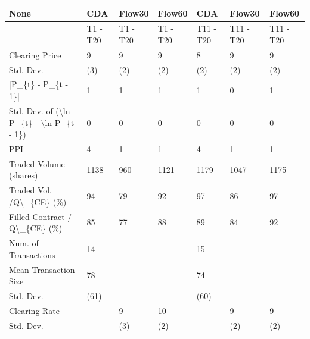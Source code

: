 \begin{tabular}{lllllll}
\hline
 None                                                      & CDA      & Flow30   & Flow60   & CDA       & Flow30    & Flow60    \\
\hline
                                                           & T1 - T20 & T1 - T20 & T1 - T20 & T11 - T20 & T11 - T20 & T11 - T20 \\
 Clearing Price                                            & 9        & 9        & 9        & 8         & 9         & 9         \\
 Std. Dev.                                                 & (3)      & (2)      & (2)      & (2)       & (2)       & (2)       \\
 |P\_\{t\} - P\_\{t - 1\}|                                       & 1        & 1        & 1        & 1         & 0         & 1         \\
 Std. Dev. of (\textbackslash{}ln P\_\{t\} - \textbackslash{}ln P\_\{t - 1\})                  & 0        & 0        & 0        & 0         & 0         & 0         \\
 PPI                                                       & 4        & 1        & 1        & 4         & 1         & 1         \\
 Traded Volume (shares)                                    & 1138     & 960      & 1121     & 1179      & 1047      & 1175      \\
 Traded Vol. /Q\textbackslash{}\_\{CE\} (\%)                                  & 94       & 79       & 92       & 97        & 86        & 97        \\
 Filled Contract / Q\textbackslash{}\_\{CE\} (\%)                             & 85       & 77       & 88       & 89        & 84        & 92        \\
 Num. of Transactions                                      & 14       &          &          & 15        &           &           \\
 Mean Transaction Size                                     & 78       &          &          & 74        &           &           \\
 Std. Dev.                                                 & (61)     &          &          & (60)      &           &           \\
 Clearing Rate                                             &          & 9        & 10       &           & 9         & 9         \\
 Std. Dev.                                                 &          & (3)      & (2)      &           & (2)       & (2)       \\

\end{tabular}

